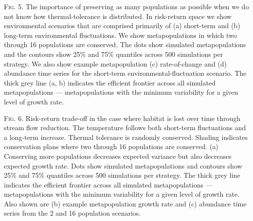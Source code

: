 \documentclass[12pt,english]{article}
\begin{document}
\begin{spacing}{1.9}

\bigskip
\noindent
\textsc{Fig. 5}. The importance of preserving as many populations as possible when we do not know how thermal-tolerance is distributed. In risk-return space we show environmental scenarios that are comprised primarily of (a) short-term and (b) long-term environmental fluctuations. We show metapopulations in which two through 16 populations are conserved. The dots show simulated metapopulations and the contours show 25\% and 75\% quantiles across 500 simulations per strategy. We also show example metapopulation (c) rate-of-change and (d) abundance time series for the short-term environmental-fluctuation scenario. The thick grey line (a, b) indicates the efficient frontier across all simulated metapopulations --- metapopulations with the minimum variability for a given level of growth rate.

\bigskip
\noindent
\textsc{Fig. 6}. Risk-return trade-off in the case where habitat is lost over time through stream flow reduction. The temperature follows both short-term fluctuations and a long-term increase. Thermal tolerance is randomly conserved. Shading indicates conservation plans where two through 16 populations are conserved. (a) Conserving more populations decreases expected variance but also decreases expected growth rate. Dots show simulated metapopulations and contours show 25\% and 75\% quantiles across 500 simulations per strategy. The thick grey line indicates the efficient frontier across all simulated metapopulations --- metapopulations with the minimum variability for a given level of growth rate. Also shown are (b) example metapopulation growth rate and (c) abundance time series from the 2 and 16 population scenarios.

\clearpage



\end{spacing}


\begin{spacing}{1.1}

%

\end{spacing}
\end{document}
